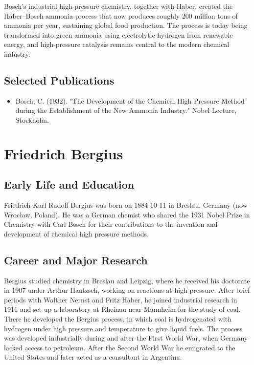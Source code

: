 Bosch's industrial high-pressure chemistry, together with Haber, created the Haber–Bosch ammonia process that now produces roughly 200 million tons of ammonia per year, sustaining global food production. The process is today being transformed into green ammonia using electrolytic hydrogen from renewable energy, and high-pressure catalysis remains central to the modern chemical industry.

\subsection*{Selected Publications}

\begin{itemize}

\item Bosch, C. (1932). "The Development of the Chemical High Pressure Method during the Establishment of the New Ammonia Industry." Nobel Lecture, Stockholm.

\end{itemize}

\clearpage

\section{Friedrich Bergius}

\subsection*{Early Life and Education}

Friedrich Karl Rudolf Bergius was born on 1884-10-11 in Breslau, Germany (now Wrocław, Poland).
He was a German chemist who shared the 1931 Nobel Prize in Chemistry with Carl Bosch for their contributions to the invention and development of chemical high pressure methods.

\subsection*{Career and Major Research}

Bergius studied chemistry in Breslau and Leipzig, where he received his doctorate in 1907 under Arthur Hantzsch, working on reactions at high pressure.
After brief periods with Walther Nernst and Fritz Haber, he joined industrial research in 1911 and set up a laboratory at Rheinau near Mannheim for the study of coal.
There he developed the Bergius process, in which coal is hydrogenated with hydrogen under high pressure and temperature to give liquid fuels.
The process was developed industrially during and after the First World War, when Germany lacked access to petroleum.
After the Second World War he emigrated to the United States and later acted as a consultant in Argentina.

